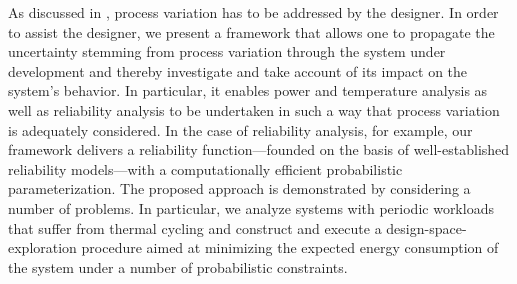 As discussed in , process variation has to be addressed
by the designer. In order to assist the designer, we present a framework that
allows one to propagate the uncertainty stemming from process variation through
the system under development and thereby investigate and take account of its
impact on the system's behavior. In particular, it enables power and temperature
analysis as well as reliability analysis to be undertaken in such a way that
process variation is adequately considered. In the case of reliability analysis,
for example, our framework delivers a reliability function---founded on the
basis of well-established reliability models---with a computationally efficient
probabilistic parameterization. The proposed approach is demonstrated by
considering a number of problems. In particular, we analyze systems with
periodic workloads that suffer from thermal cycling and construct and execute a
design-space-exploration procedure aimed at minimizing the expected energy
consumption of the system under a number of probabilistic constraints.
